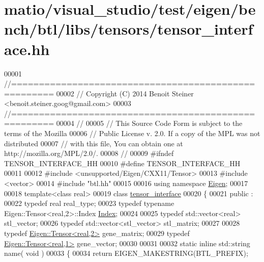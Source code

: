 \hypertarget{matio_2visual__studio_2test_2eigen_2bench_2btl_2libs_2tensors_2tensor__interface_8hh_source}{}\section{matio/visual\+\_\+studio/test/eigen/bench/btl/libs/tensors/tensor\+\_\+interface.hh}
\label{matio_2visual__studio_2test_2eigen_2bench_2btl_2libs_2tensors_2tensor__interface_8hh_source}

\begin{DoxyCode}
00001 \textcolor{comment}{//=====================================================}
00002 \textcolor{comment}{// Copyright (C) 2014 Benoit Steiner <benoit.steiner.goog@gmail.com>}
00003 \textcolor{comment}{//=====================================================}
00004 \textcolor{comment}{//}
00005 \textcolor{comment}{// This Source Code Form is subject to the terms of the Mozilla}
00006 \textcolor{comment}{// Public License v. 2.0. If a copy of the MPL was not distributed}
00007 \textcolor{comment}{// with this file, You can obtain one at http://mozilla.org/MPL/2.0/.}
00008 \textcolor{comment}{//}
00009 \textcolor{preprocessor}{#ifndef TENSOR\_INTERFACE\_HH}
00010 \textcolor{preprocessor}{#define TENSOR\_INTERFACE\_HH}
00011 
00012 \textcolor{preprocessor}{#include <unsupported/Eigen/CXX11/Tensor>}
00013 \textcolor{preprocessor}{#include <vector>}
00014 \textcolor{preprocessor}{#include "btl.hh"}
00015 
00016 \textcolor{keyword}{using namespace }\hyperlink{namespace_eigen}{Eigen};
00017 
00018 \textcolor{keyword}{template}<\textcolor{keyword}{class} real>
00019 \textcolor{keyword}{class }\hyperlink{classtensor__interface}{tensor\_interface}
00020 \{
00021 public :
00022   \textcolor{keyword}{typedef} real real\_type;
00023   \textcolor{keyword}{typedef} \textcolor{keyword}{typename} Eigen::Tensor<real,2>::Index \hyperlink{namespace_eigen_a62e77e0933482dafde8fe197d9a2cfde}{Index};
00024 
00025   \textcolor{keyword}{typedef} std::vector<real> stl\_vector;
00026   \textcolor{keyword}{typedef} std::vector<stl\_vector> stl\_matrix;
00027 
00028   \textcolor{keyword}{typedef} \hyperlink{class_eigen_1_1_tensor}{Eigen::Tensor<real,2>} gene\_matrix;
00029   \textcolor{keyword}{typedef} \hyperlink{class_eigen_1_1_tensor}{Eigen::Tensor<real,1>} gene\_vector;
00030 
00031 
00032   \textcolor{keyword}{static} \textcolor{keyword}{inline} std::string name( \textcolor{keywordtype}{void} )
00033   \{
00034     \textcolor{keywordflow}{return} EIGEN\_MAKESTRING(BTL\_PREFIX);

\end{DoxyCode}
